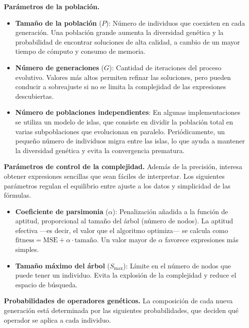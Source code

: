\documentclass[12pt,a4paper]{article} \usepackage[utf8]{inputenc} \usepackage[spanish]{babel} \usepackage{amsmath, amssymb, amsthm} \usepackage{bm} \usepackage{float} \usepackage{longtable} \usepackage[hidelinks]{hyperref}
\begin{document}
\medskip \noindent\textbf{Parámetros de la población.}
\begin{itemize}
 \item \textbf{Tamaño de la población} (\(P\)): Número de individuos que coexisten en cada generación. Una población grande aumenta la diversidad genética y la probabilidad de encontrar soluciones de alta calidad, a cambio de un mayor tiempo de cómputo y consumo de memoria.

 \item \textbf{Número de generaciones} (\(G\)): Cantidad de iteraciones del proceso evolutivo. Valores más altos permiten refinar las soluciones, pero pueden conducir a sobreajuste si no se limita la complejidad de las expresiones descubiertas.

 \item \textbf{Número de poblaciones independientes}: En algunas implementaciones se utiliza un modelo de islas, que consiste en dividir la población total en varias subpoblaciones que evolucionan en paralelo. Periódicamente, un pequeño número de individuos migra entre las islas, lo que ayuda a mantener la diversidad genética y evita la convergencia prematura.
\end{itemize}

\medskip \noindent\textbf{Parámetros de control de la complejidad.} Además de la precisión, interesa obtener expresiones sencillas que sean fáciles de interpretar. Los siguientes parámetros regulan el equilibrio entre ajuste a los datos y simplicidad de las fórmulas.

\begin{itemize}
 \item \textbf{Coeficiente de parsimonia} (\(\alpha\)): Penalización añadida a la función de aptitud, proporcional al tamaño del árbol (número de nodos). La aptitud efectiva ---es decir, el valor que el algoritmo optimiza--- se calcula como \(\text{fitness} = \text{MSE} + \alpha \cdot \text{tamaño}\). Un valor mayor de \(\alpha\) favorece expresiones más simples.

 \item \textbf{Tamaño máximo del árbol} (\(S_{\max}\)): Límite en el número de nodos que puede tener un individuo. Evita la explosión de la complejidad y reduce el espacio de búsqueda.
\end{itemize}

\medskip \noindent\textbf{Probabilidades de operadores genéticos.} La composición de cada nueva generación está determinada por las siguientes probabilidades, que deciden qué operador se aplica a cada individuo.
\end{document}
